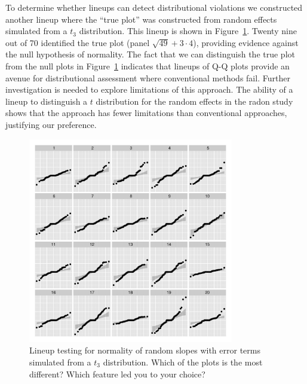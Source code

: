 \documentclass[12pt]{article} %
\newcommand{\al}[1]{{\color{ForestGreen} #1}}
\newcommand{\hhnote}[1]{\todo[inline,color=orange!40]{#1}}
\begin{document}
To determine whether lineups can detect distributional violations we constructed another lineup where the ``true plot'' was constructed from random effects simulated from a $t_3$ distribution. This lineup is shown in Figure~\ref{fig:qqlineup-t}. \al{Twenty nine out of 70} identified the true plot (panel $\sqrt{49} + 3\cdot4$), providing evidence against the null hypothesis of normality.  
 The fact that we can distinguish the true plot from the null plots in Figure~\ref{fig:qqlineup-t} indicates that lineups of Q-Q plots provide an avenue for distributional assessment where conventional methods fail. Further investigation is needed to explore limitations of this approach.%
 The ability of a lineup to distinguish a $t$ distribution for the random effects in the radon study shows that the approach has fewer limitations than conventional approaches, justifying our preference.


\begin{figure}
	\centering
	\includegraphics[width=0.8\textwidth]{radontranef-19.pdf}
	\caption{\label{fig:qqlineup-t} Lineup  testing for normality of random slopes with error terms simulated from a $t_3$ distribution. Which of the plots is the most different? Which feature led you to your choice?}
\end{figure}
\end{document}
